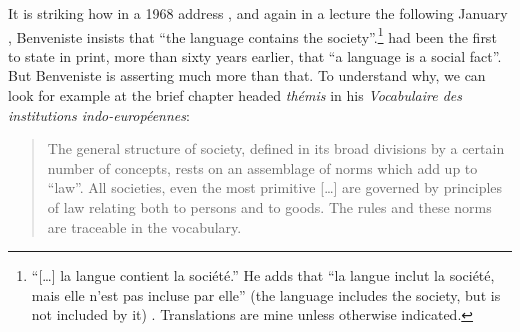 \documentclass[output=paper]{langscibook}
\begin{document}
It is striking how in a 1968 address \citep[95]{Benveniste1970structure}, and again in a lecture the following January \citep[79]{Benveniste2012}, Benveniste insists that ``the language contains the society''\label{q:joseph:langcontainssoc}.\footnote{``[…] la langue contient la société.'' He adds that ``la langue inclut la société, mais elle n’est pas incluse par elle'' (the language includes the society, but is not included by it) \citep[96]{Benveniste1970structure}. Translations are mine unless otherwise indicated.} \citet{Meillet190506} had been the first to state in print, more than sixty years earlier, that ``a language is a social fact''. But Benveniste is asserting much more than that. To understand why, we can look for example at the brief chapter headed \emph{thémis} in his \emph{Vocabulaire des institutions indo-européennes}:

\begin{quotation}
The general structure of society, defined in its broad divisions by a certain number of concepts, rests on an assemblage of norms which add up to ``law''. All societies, even the most primitive […] are governed by principles of law relating both to persons and to goods. The rules and these norms are traceable in the vocabulary.
\end{quotation}
\end{document}
